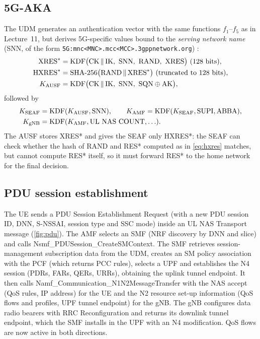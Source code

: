 \documentclass[11pt,a4paper]{article}
\begin{document}
\subsection{5G-AKA}\label{sec:aka}
The UDM generates an authentication vector with the same functions $f_1$--$f_5$ as in Lecture~11, but derives 5G-specific values bound to
the \emph{serving network name} (SNN, of the form \nolinkurl{5G:mnc<MNC>.mcc<MCC>.3gppnetwork.org}) \cite{ts33501}:
\begin{subequations}\label{eq:aka}
\begin{align}
  \mathrm{XRES}^{*} &= \KDF\bigl(\mathrm{CK}\concat\mathrm{IK},\ \mathrm{SNN},\ \mathrm{RAND},\ \mathrm{XRES}\bigr)\ \text{(128 bits)}, \label{eq:xres}\\
  \mathrm{HXRES}^{*} &= \mathrm{SHA\text{-}256}\bigl(\mathrm{RAND}\concat\mathrm{XRES}^{*}\bigr)\ \text{(truncated to 128 bits)}, \label{eq:hxres}\\
  K_{\mathrm{AUSF}} &= \KDF\bigl(\mathrm{CK}\concat\mathrm{IK},\ \mathrm{SNN},\ \mathrm{SQN}\xor\mathrm{AK}\bigr), \label{eq:kausf}
\end{align}
\end{subequations}
followed by
\[
\begin{aligned}
  K_{\mathrm{SEAF}} &= \mathrm{KDF}(K_{\mathrm{AUSF}}, \mathrm{SNN}), \qquad
  K_{\mathrm{AMF}} = \mathrm{KDF}(K_{\mathrm{SEAF}}, \mathrm{SUPI}, \mathrm{ABBA}),\\
  K_{\mathrm{gNB}} &= \mathrm{KDF}(K_{\mathrm{AMF}}, \text{UL NAS COUNT}, \ldots).
\end{aligned}
\]
The AUSF stores XRES* and gives the SEAF only HXRES*: the SEAF can check whether
the hash of RAND and RES* computed as in \cref{eq:hxres} matches, but cannot compute RES* itself, so it must forward RES* to the
home network for the final decision.

\subsection{PDU session establishment}
The UE sends a PDU Session Establishment Request (with a new PDU session ID, DNN, S-NSSAI, session type and SSC mode) inside an UL NAS
Transport message (\cref{fig:pdu}). The AMF selects an SMF (NRF discovery by DNN and slice) and calls Nsmf\_PDUSession\_CreateSMContext.
The SMF retrieves session-management subscription data from the UDM, creates an SM policy association with the PCF (which returns PCC rules),
selects a UPF and establishes the N4 session (PDRs, FARs, QERs, URRs), obtaining the uplink tunnel endpoint. It then calls
Namf\_Communication\_N1N2MessageTransfer with the NAS accept (QoS rules, IP address) for the UE and the N2 resource set-up information (QoS
flows and profiles, UPF tunnel endpoint) for the gNB. The gNB configures data radio bearers with RRC Reconfiguration and returns its
downlink tunnel endpoint, which the SMF installs in the UPF with an N4 modification. QoS flows are now active in both directions.
\end{document}
